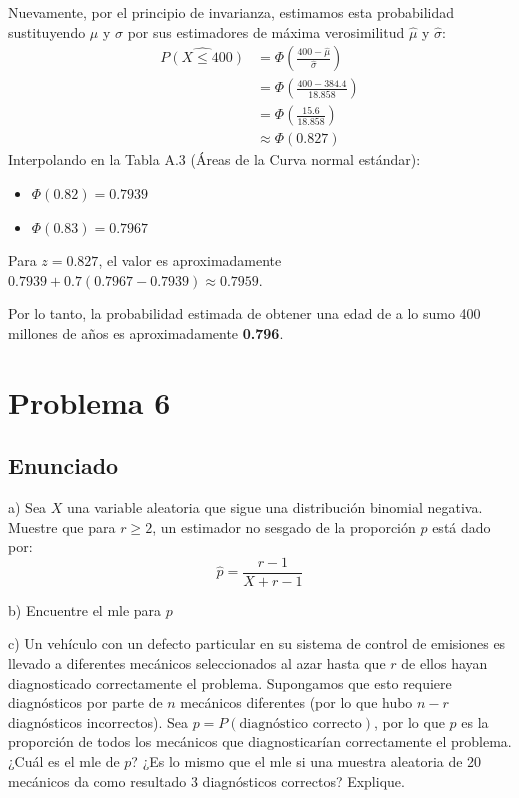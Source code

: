 \documentclass[12pt]{article}
\begin{document}
Nuevamente, por el principio de invarianza, estimamos esta probabilidad sustituyendo $\mu$ y $\sigma$ por sus estimadores de máxima verosimilitud $\hat{\mu}$ y $\hat{\sigma}$:
\begin{align*}
    \widehat{P(X \le 400)} &= \Phi\left(\frac{400 - \hat{\mu}}{\hat{\sigma}}\right) \\
    &= \Phi\left(\frac{400 - 384.4}{18.858}\right) \\
    &= \Phi\left(\frac{15.6}{18.858}\right) \\
    &\approx \Phi(0.827)
\end{align*}
Interpolando en la Tabla A.3 (Áreas de la Curva normal estándar):
\begin{itemize}
    \item $\Phi(0.82) = 0.7939$
    \item $\Phi(0.83) = 0.7967$
\end{itemize}
Para $z = 0.827$, el valor es aproximadamente $0.7939 + 0.7(0.7967 - 0.7939) \approx 0.7959$.

Por lo tanto, la probabilidad estimada de obtener una edad de a lo sumo 400 millones de años es aproximadamente \textbf{0.796}.


\section{Problema 6}

\subsection{Enunciado}

a) Sea $X$ una variable aleatoria que sigue una distribución binomial negativa. Muestre que para $r \geq 2$, un estimador no sesgado de la proporción $p$ está dado por:
$$\hat{p} = \frac{r-1}{X+r-1}$$

b) Encuentre el mle para $p$

c) Un vehículo con un defecto particular en su sistema de control de emisiones es llevado a diferentes mecánicos seleccionados al azar hasta que $r$ de ellos hayan diagnosticado correctamente el problema. Supongamos que esto requiere diagnósticos por parte de $n$ mecánicos diferentes (por lo que hubo $n-r$ diagnósticos incorrectos). Sea $p = P(\text{diagnóstico correcto})$, por lo que $p$ es la proporción de todos los mecánicos que diagnosticarían correctamente el problema. ¿Cuál es el mle de $p$? ¿Es lo mismo que el mle si una muestra aleatoria de 20 mecánicos da como resultado 3 diagnósticos correctos? Explique.
\end{document}
